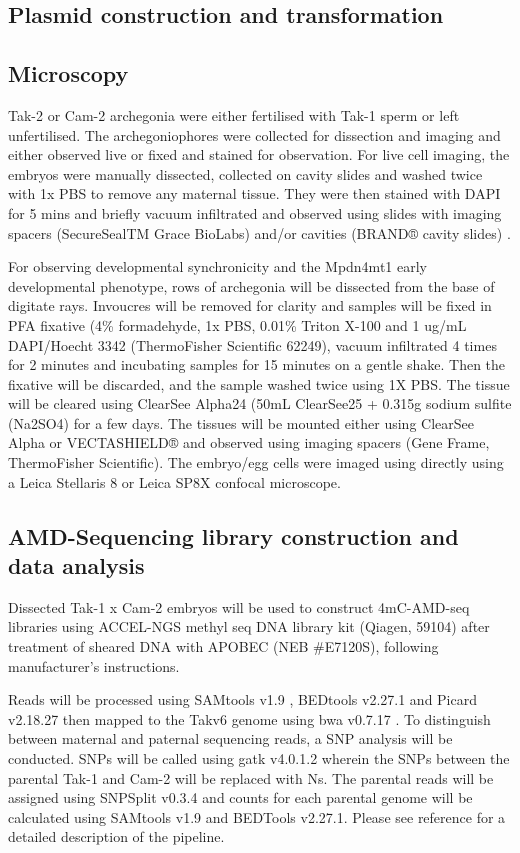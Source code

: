 \subsection{Plasmid construction and transformation}



\subsection{Microscopy} 

Tak-2 or Cam-2 archegonia were either fertilised with Tak-1 sperm or left unfertilised. The archegoniophores were collected for dissection and imaging and either observed live or fixed and stained for observation. For live cell imaging, the embryos were manually dissected, collected on cavity slides and washed twice with 1x PBS to remove any maternal tissue. They were then stained with DAPI for 5 mins and briefly vacuum infiltrated and observed using slides with imaging spacers (SecureSealTM Grace BioLabs) and/or cavities (BRAND® cavity slides) \citep{RN139}. 

For observing developmental synchronicity and the Mpdn4mt1 early developmental phenotype, rows of archegonia will be dissected from the base of digitate rays. Invoucres will be removed for clarity and samples will be fixed in PFA fixative (4\% formadehyde, 1x PBS, 0.01\% Triton X-100 and 1 ug/mL DAPI/Hoecht 3342 (ThermoFisher Scientific 62249), vacuum infiltrated 4 times for 2 minutes and incubating samples for 15 minutes on a gentle shake. Then the fixative will be discarded, and the sample washed twice using 1X PBS. The tissue will be cleared using ClearSee Alpha24 (50mL ClearSee25 + 0.315g sodium sulfite (Na2SO4) for a few days. The tissues will be mounted either using ClearSee Alpha or VECTASHIELD® and observed using imaging spacers (Gene Frame, ThermoFisher Scientific). The embryo/egg cells were imaged using directly using a Leica Stellaris 8 or Leica SP8X confocal microscope.


\subsection{AMD-Sequencing library construction and data analysis}

Dissected Tak-1 x Cam-2 embryos will be used to construct 4mC-AMD-seq libraries using ACCEL-NGS methyl seq DNA library kit (Qiagen, 59104) after treatment of sheared DNA with APOBEC (NEB \#E7120S), following manufacturer’s instructions.

Reads will be processed using SAMtools v1.9 \citep{RN174}, BEDtools v2.27.1 \citep{RN90} and Picard v2.18.27 \citep{RN173} then mapped to the Takv6 genome \citep{RN179} using bwa v0.7.17 \citep{RN182}. To distinguish between maternal and paternal sequencing reads, a SNP analysis will be conducted. SNPs will be called using gatk v4.0.1.2 \citep{RN177} wherein the SNPs between the parental Tak-1 and Cam-2 will be replaced with Ns. The parental reads will be assigned using SNPSplit v0.3.4 \citep{RN178} and counts for each parental genome will be calculated using SAMtools v1.9 and BEDTools v2.27.1. Please see reference \cite{RN160}  for a detailed description of the pipeline.
